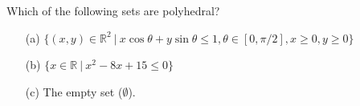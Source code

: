 Which of the following sets are polyhedral?
\begin{itemize}
\item[(a)] $\{(x,y)\in\mathbb{R}^2~|~ x \cos \theta + y\sin\theta \leq 1,\theta\in[0,\pi/2],x\geq0,y\geq0\}$
\item[(b)] $\{x\in\mathbb{R}~|~ x^2-8x+15\leq 0\}$
\item[(c)] The empty set ($\emptyset$).
\end{itemize}